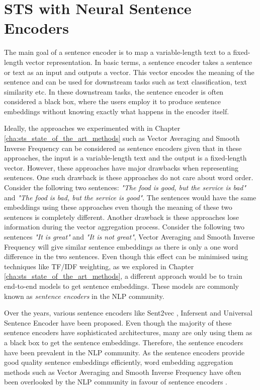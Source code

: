 \chapter{\label{cha:sts_sentence_encoders}STS with Neural Sentence Encoders}

The main goal of a sentence encoder is to map a variable-length text to a fixed-length vector representation. In basic terms, a sentence encoder takes a sentence or text as an input and outputs a vector. This vector encodes the meaning of the sentence and can be used for downstream tasks such as text classification, text similarity etc. In these downstream tasks, the sentence encoder is often considered a black box, where the users employ it to produce sentence embeddings without knowing exactly what happens in the encoder itself. 

Ideally, the approaches we experimented with in Chapter \ref{cha:sts_state_of_the_art_methods} such as Vector Averaging \autocite{mitchell-lapata-2008-vector} and Smooth Inverse Frequency \autocite{DBLP:conf/iclr/AroraLM17} can be considered as sentence encoders given that in these approaches, the input is a variable-length text and the output is a fixed-length vector. However, these approaches have major drawbacks when representing sentences. One such drawback is these approaches do not care about word order. Consider the following two sentences: \textit{"The food is good, but the service is bad"} and \textit{"The food is bad, but the service is good"}. The sentences would have the same embeddings using these approaches even though the meaning of these two sentences is completely different. Another drawback is these approaches lose information during the vector aggregation process. Consider the following two sentences \textit{"It is great"} and \textit{"It is not great"}, Vector Averaging and Smooth Inverse Frequency will give similar sentence embeddings as there is only a one word difference in the two sentences. Even though this effect can be minimised using techniques like TF/IDF weighting, as we explored in Chapter \ref{cha:sts_state_of_the_art_methods}, a different approach would be to train end-to-end models to get sentence embeddings. These models are commonly known as \textit{sentence encoders} in the NLP community.

Over the years, various sentence encoders like Sent2vec \autocite{pagliardini-etal-2018-unsupervised}, Infersent  \autocite{cer2018universal} and Universal Sentence Encoder \autocite{conneau-EtAl:2017:EMNLP2017} have been proposed. Even though the majority of these sentence encoders have sophisticated architectures, many are only using them as a black box to get the sentence embeddings. Therefore, the sentence encoders have been prevalent in the NLP community. As the sentence encoders provide good quality sentence embeddings efficiently, word embedding aggregation methods such as Vector Averaging \autocite{mitchell-lapata-2008-vector} and Smooth Inverse Frequency \autocite{mitchell-lapata-2008-vector} have often been overlooked by the NLP community in favour of sentence encoders \autocite{logeswaran2018an}. 


